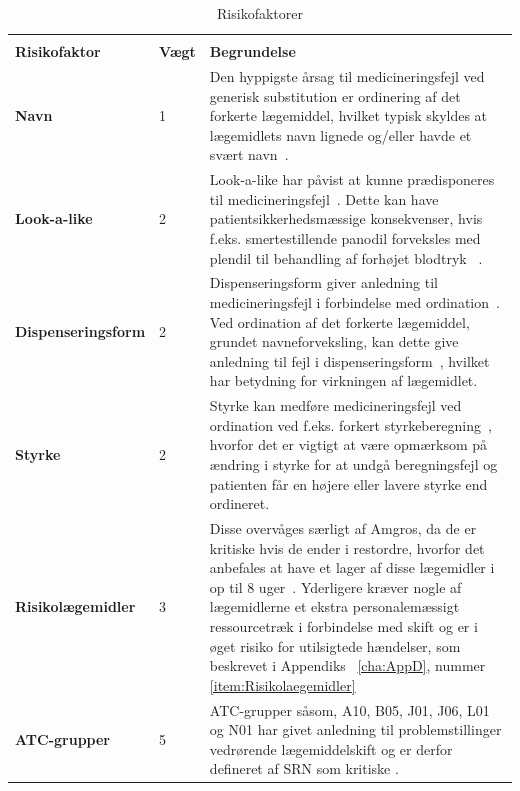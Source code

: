 \begin{longtable}{p{3.5cm}| p{1.0cm} | p{9.2cm}}
	\caption{Risikofaktorer} \vspace{0.2cm}
	\label{table:features} \\
\cellcolor[HTML]{C0C0C0} {\textbf{Risikofaktor}} & \cellcolor[HTML]{C0C0C0} {\textbf{Vægt}} & \cellcolor[HTML]{C0C0C0} {\textbf{Begrundelse}} \\ \hline
\textbf{Navn} & 1 & Den hyppigste årsag til medicineringsfejl ved generisk substitution er ordinering af det forkerte lægemiddel, hvilket typisk skyldes at lægemidlets navn lignede og/eller havde et svært navn~\citep{Hakonsen2010}. \\  \hline 
\textbf{Look-a-like} & 2 & Look-a-like har påvist at kunne prædisponeres til medicineringsfejl~\citep{Wittich2014}. Dette kan have patientsikkerhedsmæssige konsekvenser, hvis f.eks. smertestillende panodil forveksles med plendil til behandling af forhøjet blodtryk ~\citep{DanskSelskabforPatientsikkerhed2009}.\\  \hline 
\textbf{Dispenseringsform} & 2 & Dispenseringsform giver anledning til medicineringsfejl i forbindelse med ordination~\citep{Agrawal2009}. Ved ordination af det forkerte lægemiddel, grundet navneforveksling, kan dette give anledning til fejl i dispenseringsform~\citep{DanskSelskabforPatientsikkerhed2009}, hvilket har betydning for virkningen af lægemidlet.
\\ \hline 
\textbf{Styrke} & 2 & Styrke kan medføre medicineringsfejl ved ordination ved f.eks. forkert styrkeberegning~\citep{Agrawal2009}, hvorfor det er vigtigt at være opmærksom på  ændring i styrke for at undgå beregningsfejl og patienten får en højere eller lavere styrke end ordineret.\\ \hline
\textbf{Risikolægemidler} & 3 & Disse overvåges særligt af Amgros, da de er kritiske hvis de ender i restordre, hvorfor det anbefales at have et lager af disse lægemidler i op til 8 uger~\citep{Amgros}. Yderligere kræver nogle af lægemidlerne et ekstra personalemæssigt ressourcetræk i forbindelse med skift og er i øget risiko for utilsigtede hændelser, som beskrevet i Appendiks ~\ref{cha:AppD}, nummer \ref{item:Risikolaegemidler}  \\ \hline 
\textbf{ATC-grupper} & 5 & ATC-grupper såsom, A10, B05, J01, J06, L01 og N01 har givet anledning til problemstillinger vedrørende lægemiddelskift og er derfor defineret af SRN som kritiske \citep{SRN}.

\end{longtable}
